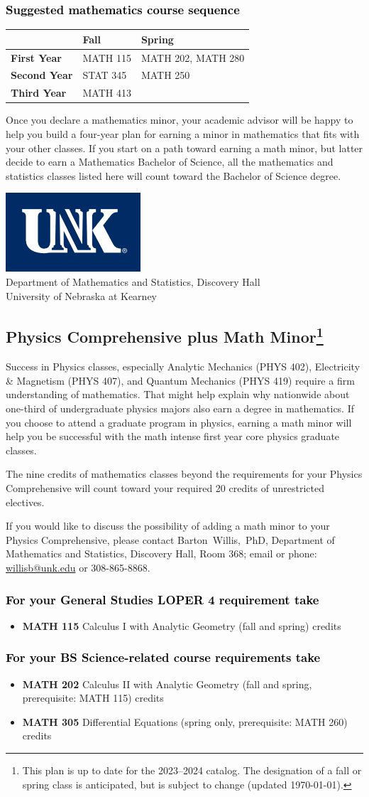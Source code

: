 \documentclass[10pt]{article}
\makeatletter
\newcommand{\calcone}{\textbf{MATH 115} Calculus I with Analytic Geometry (fall and spring) \dotfill 5 credits}
\newcommand{\calconeshort}{MATH 115}
\newcommand{\calctwo}{\textbf{MATH 202} Calculus II with Analytic Geometry (fall and spring, prerequisite: MATH 115) \dotfill 5 credits }
\newcommand{\calctwoshort}{MATH 202}
\newcommand{\foundationsshort}{MATH 250}
\newcommand{\linearshort}{MATH 280}
\newcommand{\discreteshort}{MATH 413}
\newcommand{\diffeq}{\textbf{MATH 305}	Differential Equations (spring only, prerequisite: MATH 260) \dotfill 	3 credits}
\newcommand{\appliedstatshort}{STAT 345}
\newcommand{\contactbw}{\mbox{Barton Willis, PhD}, Department of Mathematics and Statistics,  Discovery Hall, Room 368;
email or phone: \href{mailto:willisb@unk.edu}{willisb@unk.edu} or 308-865-8868.}
\newcommand{\forinfo}[2]{If you would like to discuss the possibility of adding a math {#1} to your {#2}, please contact \contactbw}
\newcommand{\catalog}{2023--2024 }
\newcommand{\LOPER}{LOPER\xspace}
\newcommand{\myfootnote}{\footnote{This plan is up to date for  the \catalog catalog. The designation of a fall or spring class is 
anticipated, but  is subject to change (updated \today).}}
\newcommand{\myheading}{
\begin{flushleft}
\includegraphics[scale=0.35]{unk-logo}\\
\setcounter{footnote}{0}
\vspace{0.25in}
 \textcolor{unkblue}{Department of Mathematics and Statistics, Discovery Hall} \\
  \textcolor{unkblue}{University of Nebraska at Kearney}
\end{flushleft}}
\newcommand{\mathminor}{
  \begin{center}
   \begin{tabular}[h]{| l | l | l|} 
      \hline
      & \textbf{Fall}         &  \textbf{Spring}  \\ \hline 
      \textbf{First Year} & \calconeshort & \calctwoshort, \linearshort \\  \hline
      \textbf{Second Year} &  \appliedstatshort{} &  \foundationsshort \\ \hline
      \textbf{Third Year} &    \discreteshort              &  \\ \hline
      \end{tabular}
      \end{center}}
\makeatother
\begin{document}
\vspace{-0.1in}
\subsubsection*{\textcolor{black}{Suggested mathematics course sequence}}

\mathminor

\vspace{0.1in}
\noindent Once you declare a mathematics minor, your academic advisor 
will be happy to help you build a four-year plan for earning a minor 
in mathematics that fits with your other classes.  If you start on 
a path toward earning a math minor, but latter decide to earn a  
Mathematics Bachelor of Science, all the mathematics and statistics  classes listed here will count toward the Bachelor of Science degree.


\newpage

\myheading


\subsection*{\textbf{\textcolor{unkblue}{Physics Comprehensive plus Math Minor\myfootnote}}}

\noindent Success in Physics classes, especially  Analytic Mechanics (PHYS 402), Electricity \& Magnetism (PHYS 407), and Quantum Mechanics (PHYS 419) require a firm understanding of mathematics. That might help explain why nationwide about one-third of undergraduate physics majors also earn a degree in mathematics. If you choose to attend a graduate program in physics, earning a math minor will help you be successful with the math intense first year core physics graduate classes.

The nine credits of mathematics classes beyond the requirements for your Physics Comprehensive will count toward your required 20 credits of unrestricted electives.


\forinfo{minor}{Physics Comprehensive}

\subsubsection*{\textcolor{black}{For your General Studies \LOPER 4 requirement take}}
\begin{itemize}
\item \calcone
\end{itemize}

\subsubsection*{\textcolor{black}{For your BS Science-related course requirements take}}
\begin{itemize}
\item \calctwo
\item \diffeq
\end{itemize}
\end{document}
